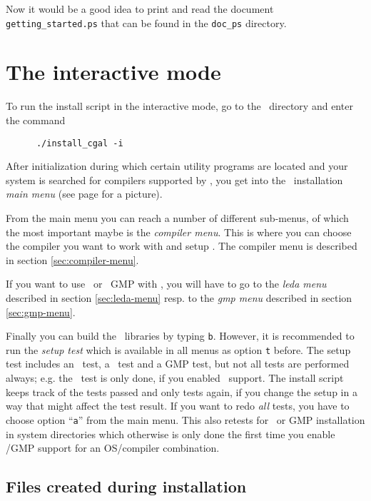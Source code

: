 Now it would be a good idea to print and read the document
\texttt{getting\_started.ps} that can be found in the \texttt{doc\_ps}
directory.

\section{The interactive mode}\label{sec:interactive-mode}

To run the install script in the interactive mode, go to the \cgaldir\ 
directory and enter the command
\begin{verbatim}
      ./install_cgal -i
\end{verbatim}

After initialization during which certain utility programs are located
and your system is searched for compilers supported by \cgal, you get
into the \cgal\ installation \textit{main menu} (see page
\pageref{pic:main-menu} for a picture).

From the main menu you can reach a number of different sub-menus, of
which the most important maybe is the \textit{compiler menu}. This is
where you can choose the compiler you want to work with and setup
\stl.  The compiler menu is described in section
\ref{sec:compiler-menu}.

If you want to use \leda\ or \gnu\ GMP with \cgal, you will have to go
to the \textit{leda menu} described in section \ref{sec:leda-menu} resp.
to the \textit{gmp menu} described in section \ref{sec:gmp-menu}.

Finally you can build the \cgal\ libraries by typing \texttt{b}.
However, it is recommended to run the \textit{setup test} which is
available in all menus as option \texttt{t} before. The setup test
includes an \stl\ test, a \leda\ test and a GMP test, but not all
tests are performed always; e.g. the \leda\ test is only done, if you
enabled \leda\ support. The install script keeps track of the tests
passed and only tests again, if you change the setup in a way that
might affect the test result. If you want to redo \textit{all} tests,
you have to choose option ``\texttt{a}'' from the main menu. This also
retests for \leda\ or GMP installation in system directories which
otherwise is only done the first time you enable \leda/GMP support for
an OS/compiler combination.

\subsection{Files created during installation}

